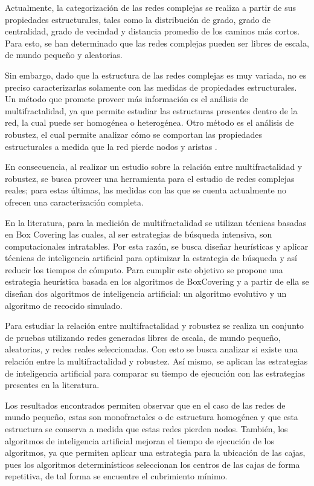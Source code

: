 Actualmente, la categorización de las redes complejas se realiza a partir de sus propiedades estructurales, tales como la distribución de grado, grado de centralidad, grado de vecindad y distancia promedio de los caminos más cortos. Para esto, se han determinado que las redes complejas pueden ser libres de escala, de mundo pequeño y aleatorias\cite{BarabasiNetwork}.

Sin embargo, dado que la estructura de las redes complejas es muy variada, no es preciso caracterizarlas solamente con las medidas de propiedades estructurales. Un método que promete proveer más información es el análisis de multifractalidad, ya que permite estudiar las estructuras presentes dentro de la red, la cual puede ser homogénea o heterogénea\cite{Liu2015}. Otro método es el análisis de robustez, el cual permite analizar cómo se comportan las propiedades estructurales a medida que la red pierde nodos y aristas \cite{Martin-Hernandez2013}.

En consecuencia, al realizar un estudio sobre la relación entre multifractalidad y robustez, se busca proveer una herramienta para el estudio de redes complejas reales; para estas últimas, las medidas con las que se cuenta actualmente no ofrecen una caracterización completa.

En la literatura, para la medición de multifractalidad se utilizan técnicas basadas en Box Covering\cite{Shuhei2011} las cuales, al ser estrategias de búsqueda intensiva, son computacionales intratables. Por esta razón, se busca diseñar heurísticas y aplicar técnicas de inteligencia artificial para optimizar la estrategia de búsqueda y así reducir los tiempos de cómputo. Para cumplir este objetivo se propone una estrategia heurística basada en los algoritmos de BoxCovering y a partir de ella se diseñan dos algoritmos de inteligencia artificial: un algoritmo evolutivo y un algoritmo de recocido simulado.

Para estudiar la relación entre multifractalidad y robustez se realiza un conjunto de pruebas utilizando redes generadas libres de escala, de mundo pequeño, aleatorias, y redes reales seleccionadas. Con esto se busca analizar si existe una relación entre la multifractalidad y robustez. Así mismo, se aplican las estrategias de inteligencia artificial para comparar su tiempo de ejecución con las estrategias presentes en la literatura.

Los resultados encontrados permiten observar que en el caso de las redes de mundo pequeño, estas son monofractales o de estructura homogénea y que esta estructura se conserva a medida que estas redes pierden nodos. También, los algoritmos de inteligencia artificial mejoran el tiempo de ejecución de los algoritmos, ya que permiten aplicar una estrategia para la ubicación de las cajas, pues los algoritmos determinísticos seleccionan los centros de las cajas de forma repetitiva, de tal forma se encuentre el cubrimiento mínimo.


